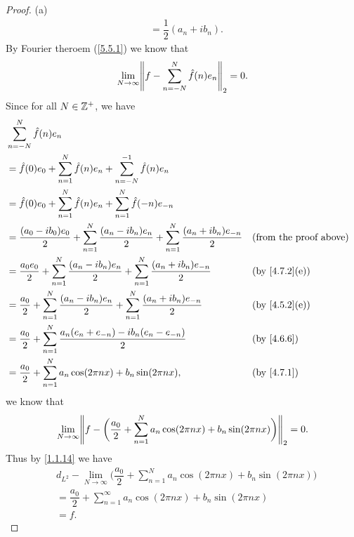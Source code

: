 \begin{proof}{(a)}
\begin{align*}
     & = \dfrac{1}{2} (a_n + i b_n).
  \end{align*}
  By Fourier theroem (\cref{5.5.1}) we know that
  \[
    \lim_{N \to \infty} \norm*{f - \sum_{n = -N}^N \hat{f}(n) e_n}_2 = 0.
  \]
  Since for all \(N \in \mathbb{Z}^+\), we have
  \begin{align*}
     & \sum_{n = -N}^N \hat{f}(n) e_n                                                                                                                                   \\
     & = \hat{f}(0) e_0 + \sum_{n = 1}^N \hat{f}(n) e_n + \sum_{n = -N}^{-1} \hat{f}(n) e_n                                                                             \\
     & = \hat{f}(0) e_0 + \sum_{n = 1}^N \hat{f}(n) e_n + \sum_{n = 1}^N \hat{f}(-n) e_{-n}                                                                             \\
     & = \dfrac{(a_0 - i b_0) e_0}{2} + \sum_{n = 1}^N \dfrac{(a_n - i b_n) e_n}{2} + \sum_{n = 1}^N \dfrac{(a_n + i b_n) e_{-n}}{2} &  & \text{(from the proof above)} \\
     & = \dfrac{a_0 e_0}{2} + \sum_{n = 1}^N \dfrac{(a_n - i b_n) e_n}{2} + \sum_{n = 1}^N \dfrac{(a_n + i b_n) e_{-n}}{2}           &  & \text{(by \cref{4.7.2}(e))}   \\
     & = \dfrac{a_0}{2} + \sum_{n = 1}^N \dfrac{(a_n - i b_n) e_n}{2} + \sum_{n = 1}^N \dfrac{(a_n + i b_n) e_{-n}}{2}               &  & \text{(by \cref{4.5.2}(e))}   \\
     & = \dfrac{a_0}{2} + \sum_{n = 1}^N \dfrac{a_n (e_n + e_{-n}) - i b_n (e_n - e_{-n})}{2}                                        &  & \by{4.6.6}                    \\
     & = \dfrac{a_0}{2} + \sum_{n = 1}^N a_n \cos(2 \pi n x) + b_n \sin(2 \pi n x),                                                  &  & \by{4.7.1}
  \end{align*}
  we know that
  \[
    \lim_{N \to \infty} \norm*{f - \bigg(\dfrac{a_0}{2} + \sum_{n = 1}^N a_n \cos(2 \pi n x) + b_n \sin(2 \pi n x)\bigg)}_2 = 0.
  \]
  Thus by \cref{1.1.14} we have
  \begin{align*}
     & d_{L^2} - \lim_{N \to \infty} \bigg(\dfrac{a_0}{2} + \sum_{n = 1}^N a_n \cos(2 \pi n x) + b_n \sin(2 \pi n x)\bigg) \\
     & = \dfrac{a_0}{2} + \sum_{n = 1}^\infty a_n \cos(2 \pi n x) + b_n \sin(2 \pi n x)                                    \\
     & = f.
  \end{align*}
\end{proof}

